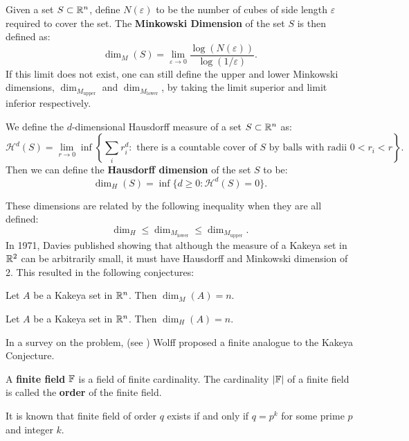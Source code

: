 \begin{definition}
Given a set $S \subset \mathbb R^n$, define $N(\varepsilon)$ to be the number of cubes of side length $\varepsilon$ required to cover the set.
The \textbf{Minkowski Dimension} of the set $S$ is then defined as:
$$\dim_M (S) = \lim_{\varepsilon \to 0} \frac{\log( N(\varepsilon))}{\log (1/\varepsilon)}.$$
If this limit does not exist, one can still define the upper and lower Minkowski dimensions, 
$\dim_{M_{\text{upper}}}$ and $\dim_{M_{\text{lower}}}$, by taking the limit superior and limit inferior respectively.
\end{definition}
\begin{definition}
    We define the $d$-dimensional Hausdorff measure of a set $S \subset \mathbb R^n$ as: 
    $$\mathcal{H}^d(S)=\lim_{r \to 0} \inf \left\{\sum_i r_i^d:\text{ there is a countable cover of } S\text{ by balls with radii } 0 < r_i < r\right\}.$$
    Then we can define the \textbf{Hausdorff dimension} of the set $S$ to be:
    $$\dim_H (S) = \inf \{ d \geq 0 : \mathcal{H}^d(S) = 0 \}.   $$
\end{definition}
These dimensions are related by the following inequality when they are all defined:
$$\dim_H \leq \dim_{M_{\text{lower}}} \leq \dim_{M_{\text{upper}}}.$$
In 1971, Davies published \cite{davies1971some} showing that
although the measure of a Kakeya set in $\mathbb R^2$ can be arbitrarily small, it must have Hausdorff and Minkowski dimension of 2.
This resulted in the following conjectures:
\begin{conjecture}
    Let $A$ be a Kakeya set in $\mathbb R^n$. Then $\dim_M (A) = n$. \label{conj:mink-kakeya}
\end{conjecture}
\begin{conjecture}
    Let $A$ be a Kakeya set in $\mathbb R^n$. Then $\dim_H (A) = n$. \label{conj:haus-kakeya}
\end{conjecture}
In a survey on the problem, (see \cite{wolff1999recent}) Wolff proposed a finite analogue to the Kakeya Conjecture.

\begin{definition}
    A \textbf{finite field} $\mathbb F$ is a field of finite cardinality. 
    The cardinality $|\mathbb F|$ of a finite field is called the \textbf{order} of the finite field.
\end{definition}
It is known that finite field of order $q$ exists if and only if $q = p^k$ for some prime $p$ and integer $k$. 

